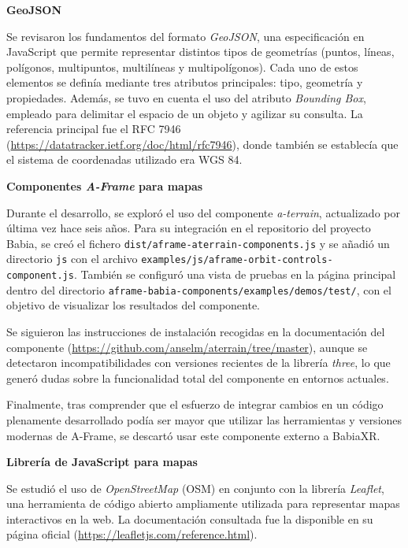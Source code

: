 \documentclass[a4paper, 12pt]{book}
\begin{document}
\vspace{0.5em}
\textbf{GeoJSON}

Se revisaron los fundamentos del formato \textit{GeoJSON}, una especificación en JavaScript que permite representar distintos tipos de geometrías (puntos, líneas, polígonos, multipuntos, multilíneas y multipolígonos). Cada uno de estos elementos se definía mediante tres atributos principales: tipo, geometría y propiedades. Además, se tuvo en cuenta el uso del atributo \textit{Bounding Box}, empleado para delimitar el espacio de un objeto y agilizar su consulta. La referencia principal fue el RFC 7946 (\url{https://datatracker.ietf.org/doc/html/rfc7946}), donde también se establecía que el sistema de coordenadas utilizado era WGS 84.

\vspace{0.5em}
\textbf{Componentes \textit{A-Frame} para mapas}

Durante el desarrollo, se exploró el uso del componente \textit{a-terrain}, actualizado por última vez hace seis años. Para su integración en el repositorio del proyecto Babia, se creó el fichero \texttt{dist/aframe-aterrain-components.js} y se añadió un directorio \texttt{js} con el archivo \texttt{examples/js/aframe-orbit-controls-component.js}. También se configuró una vista de pruebas en la página principal dentro del directorio \texttt{aframe-babia-components/examples/demos/test/}, con el objetivo de visualizar los resultados del componente.

Se siguieron las instrucciones de instalación recogidas en la documentación del componente (\url{https://github.com/anselm/aterrain/tree/master}), aunque se detectaron incompatibilidades con versiones recientes de la librería \textit{three}, lo que generó dudas sobre la funcionalidad total del componente en entornos actuales.

Finalmente, tras comprender que el esfuerzo de integrar cambios en un código plenamente desarrollado podía ser mayor que utilizar las herramientas y versiones modernas de A-Frame, se descartó usar este componente externo a BabiaXR.

\vspace{0.5em}
\textbf{Librería de JavaScript para mapas}

Se estudió el uso de \textit{OpenStreetMap} (OSM) en conjunto con la librería \textit{Leaflet}, una herramienta de código abierto ampliamente utilizada para representar mapas interactivos en la web. La documentación consultada fue la disponible en su página oficial (\url{https://leafletjs.com/reference.html}).
\end{document}
